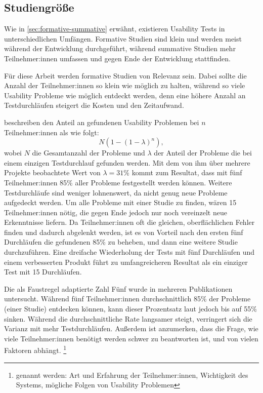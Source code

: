 \subsection{Studiengröße}
\label{sec:study-size}

Wie in \ref{sec:formative-summative} erwähnt, existieren Usability Tests in unterschiedlichen Umfängen. Formative Studien sind klein und werden meist während der Entwicklung durchgeführt, während summative Studien mehr Teilnehmer:innen umfassen und gegen Ende der Entwicklung stattfinden.

Für diese Arbeit werden formative Studien von Relevanz sein. Dabei sollte die Anzahl der Teilnehmer:innen so klein wie möglich zu halten, während so viele Usability Probleme wie möglich entdeckt werden, denn eine höhere Anzahl an Testdurchläufen steigert die Kosten und den Zeitaufwand.
\parencites{faulknerFiveuserAssumption2003, nielsenWhyYou2000}

\textcite{nielsenMathematicalModel1993} beschreiben den Anteil an gefundenen Usability Problemen bei
$n$ Teilnehmer:innen als wie folgt:
\begin{equation}
  \label{equ:finding-usability-problems}
  N(1-(1-\lambda{})^n),
\end{equation}
wobei $N$ die Gesamtanzahl der Probleme und $\lambda{}$ der Anteil der Probleme die bei einem einzigen Testdurchlauf gefunden werden. Mit dem von ihm über mehrere Projekte beobachtete Wert von $\lambda{}=31\%$ kommt \textcite{nielsenWhyYou2000} zum Resultat, dass mit fünf Teilnehmer:innen 85\% aller Probleme festgestellt werden können. \cite{nielsenWhyYou2000} Weitere Testdurchläufe sind weniger lohnenswert, da nicht genug neue Probleme aufgedeckt werden. Um alle Probleme mit einer Studie zu finden, wären 15 Teilnehmer:innen nötig, die gegen Ende jedoch nur noch vereinzelt neue Erkenntnisse liefern. Da Teilnehmer:innen oft die gleichen, oberflächlichen Fehler finden und dadurch abgelenkt werden, ist es von Vorteil nach den ersten fünf Durchläufen die gefundenen 85\% zu beheben, und dann eine weitere Studie durchzuführen. Eine dreifache Wiederholung der Tests mit fünf Durchläufen und einem verbesserten Produkt führt zu umfangreicheren Resultat als ein einziger Test mit 15 Durchläufen.
\parencite{nielsenWhyYou2000}

Die als Faustregel adaptierte Zahl Fünf wurde in mehreren Publikationen untersucht. Während fünf Teilnehmer:innen durchschnittlich 85\% der Probleme (einer Studie) entdecken können, kann dieser Prozentsatz laut \textcite{faulknerFiveuserAssumption2003} jedoch bis auf 55\% sinken. Während die durchschnittliche Rate langsamer steigt, verringert sich die Varianz mit mehr Testdurchläufen. Außerdem ist anzumerken, dass die Frage, wie viele Teilnehmer:innen benötigt werden schwer zu beantworten ist, und von vielen Faktoren abhängt. \footnote{genannt werden: Art und Erfahrung der Teilnehmer:innen, Wichtigkeit des Systems, mögliche Folgen von Usability Problemen}
\parencite{faulknerFiveuserAssumption2003}

